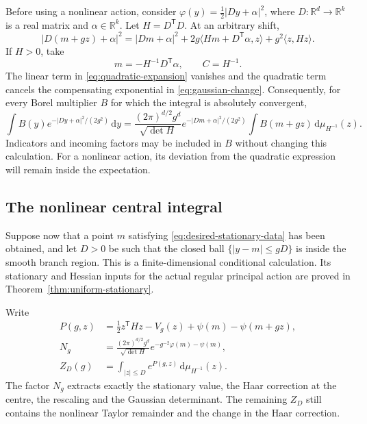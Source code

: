 \documentclass[11pt,reqno]{amsart}
\numberwithin{equation}{section}
\theoremstyle{definition}
\theoremstyle{remark}
\newcommand{\R}{\mathbb R}
\newcommand{\dd}{\mathrm d}
\begin{document}
Before using a nonlinear action, consider
\(\varphi(y)=\tfrac12|Dy+\alpha|^2\), where
\(D:\R^d\to\R^k\) is a real matrix and \(\alpha\in\R^k\).
Let \(H=D^{\mathsf T}D\). At an arbitrary shift,
\begin{equation}
 |D(m+gz)+\alpha|^2
  =|Dm+\alpha|^2
    +2g\langle Hm+D^{\mathsf T}\alpha,z\rangle
    +g^2\langle z,H z\rangle.
 \label{eq:quadratic-expansion}
\end{equation}
If \(H>0\), take
\begin{equation}
             m=-H^{-1}D^{\mathsf T}\alpha,
             \qquad C=H^{-1}.
 \label{eq:quadratic-choice}
\end{equation}
The linear term in \eqref{eq:quadratic-expansion} vanishes and the
quadratic term cancels the compensating exponential in
\eqref{eq:gaussian-change}. Consequently, for every Borel
multiplier \(B\) for which the integral is absolutely convergent,
\begin{equation}
 \int B(y)e^{-|Dy+\alpha|^2/(2g^2)}\,\dd y
  =\frac{(2\pi)^{d/2}g^d}{\sqrt{\det H}}
    e^{-|Dm+\alpha|^2/(2g^2)}
             \int B(m+gz)\,\dd\mu_{H^{-1}}(z).
 \label{eq:quadratic-identity}
\end{equation}
Indicators and incoming factors may be included in \(B\) without
changing this calculation. For a nonlinear action, its deviation
from the quadratic expression will remain inside the expectation.

\subsection{The nonlinear central integral}

Suppose now that a point \(m\) satisfying
\eqref{eq:desired-stationary-data} has been obtained, and let
\(D>0\) be such that the closed ball
\(\{|y-m|\le gD\}\) is inside the smooth branch region.
This is a finite-dimensional conditional calculation. Its
stationary and Hessian inputs for the actual regular principal
action are proved in Theorem~\ref{thm:uniform-stationary}.

Write
\begin{align}
 P(g,z)&=\tfrac12z^{\mathsf T}H z-V_g(z)
                           +\psi(m)-\psi(m+gz),
                           \label{eq:central-exponent}\\
 N_g&=\frac{(2\pi)^{d/2}g^d}{\sqrt{\det H}}
                 e^{-g^{-2}\varphi(m)-\psi(m)},
                           \label{eq:gaussian-normalisation}\\
 Z_D(g)&=\int_{|z|\le D}e^{P(g,z)}\,\dd\mu_{H^{-1}}(z).
                           \label{eq:central-Z}
\end{align}
The factor \(N_g\) extracts exactly the stationary value,
the Haar correction at the centre, the rescaling and the Gaussian
determinant. The remaining \(Z_D\) still contains the nonlinear
Taylor remainder and the change in the Haar correction.
\end{document}
